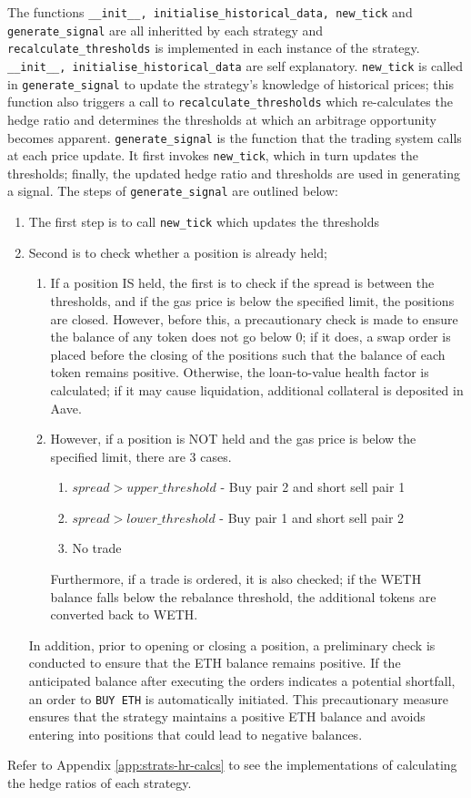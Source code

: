 \noindent The functions \texttt{\_\_init\_\_,\ initialise\_historical\_data,\ new\_tick} and \texttt{generate\_signal} are all inheritted by each strategy and \texttt{recalculate\_thresholds} is implemented in each instance of the strategy. \texttt{\_\_init\_\_,\ initialise\_historical\_data} are self explanatory. \texttt{new\_tick} is called in \texttt{generate\_signal} to update the strategy's knowledge of historical prices; this function also triggers a call to \texttt{recalculate\_thresholds} which re-calculates the hedge ratio and determines the thresholds at which an arbitrage opportunity becomes apparent. \texttt{generate\_signal} is the function that the trading system calls at each price update. It first invokes \texttt{new\_tick}, which in turn updates the thresholds; finally, the updated hedge ratio and thresholds are used in generating a signal. The steps of \texttt{generate\_signal} are outlined below:
\begin{enumerate}
    \item The first step is to call \texttt{new\_tick} which updates the thresholds
    \item Second is to check whether a position is already held;
    \begin{enumerate}
        \item If a position IS held, the first is to check if the spread is between the thresholds, and if the gas price is below the specified limit, the positions are closed. However, before this, a precautionary check is made to ensure the balance of any token does not go below 0; if it does, a swap order is placed before the closing of the positions such that the balance of each token remains positive. Otherwise, the loan-to-value health factor is calculated; if it may cause liquidation, additional collateral is deposited in Aave.
        \item However, if a position is NOT held and the gas price is below the specified limit, there are 3 cases. \begin{enumerate}
            \item $spread > upper\_threshold$ - Buy pair 2 and short sell pair 1
            \item $spread > lower\_threshold$ - Buy pair 1 and short sell pair 2
            \item No trade
        \end{enumerate}
        Furthermore, if a trade is ordered, it is also checked; if the WETH balance falls below the rebalance threshold, the additional tokens are converted back to WETH.
    \end{enumerate}
    In addition, prior to opening or closing a position, a preliminary check is conducted to ensure that the ETH balance remains positive. If the anticipated balance after executing the orders indicates a potential shortfall, an order to \texttt{BUY\ ETH} is automatically initiated. This precautionary measure ensures that the strategy maintains a positive ETH balance and avoids entering into positions that could lead to negative balances.
\end{enumerate}
Refer to Appendix \ref{app:strats-hr-calcs} to see the implementations of calculating the hedge ratios of each strategy.


